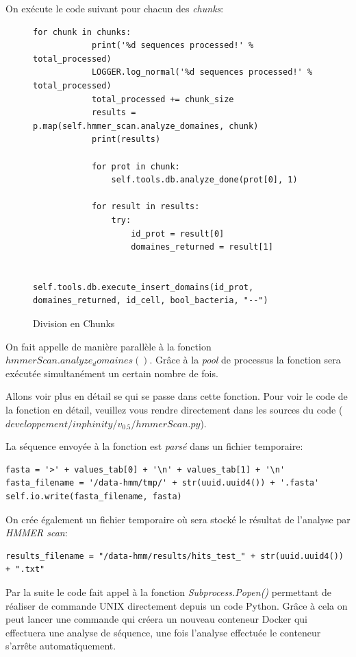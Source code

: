On exécute le code suivant pour chacun des \emph{chunks}:

\begin{figure}[H] 
\centering 
\begin{lstlisting}[frame=single]
for chunk in chunks:
            print('%d sequences processed!' % total_processed)
            LOGGER.log_normal('%d sequences processed!' % total_processed)
            total_processed += chunk_size
            results = p.map(self.hmmer_scan.analyze_domaines, chunk)
            print(results)

            for prot in chunk:
                self.tools.db.analyze_done(prot[0], 1)

            for result in results:
                try:
                    id_prot = result[0]
                    domaines_returned = result[1]

                    self.tools.db.execute_insert_domains(id_prot, domaines_returned, id_cell, bool_bacteria, "--")
\end{lstlisting} 
\caption[Division en Chunks]{Division en Chunks}
\label{fig:chunks} 
\end{figure}

On fait appelle de manière parallèle à la fonction \emph{$hmmerScan.analyze_domaines()$}. Grâce à la \emph{pool} de processus la fonction sera exécutée simultanément un certain nombre de fois.

Allons voir plus en détail se qui se passe dans cette fonction. Pour voir le code de la fonction en détail, veuillez vous rendre directement dans les sources du code (\emph{$developpement/inphinity/v_0.5/hmmerScan.py$}).

La séquence envoyée à la fonction est \emph{parsé} dans un fichier temporaire:

\begin{lstlisting}[frame=single]
fasta = '>' + values_tab[0] + '\n' + values_tab[1] + '\n'
fasta_filename = '/data-hmm/tmp/' + str(uuid.uuid4()) + '.fasta'
self.io.write(fasta_filename, fasta)
\end{lstlisting} 

On crée également un fichier temporaire où sera stocké le résultat de l'analyse par \emph{HMMER scan}:

\begin{lstlisting}[frame=single]
results_filename = "/data-hmm/results/hits_test_" + str(uuid.uuid4()) + ".txt"
\end{lstlisting} 

Par la suite le code fait appel à la fonction \emph{Subprocess.Popen()} permettant de réaliser de commande UNIX directement depuis un code Python. Grâce à cela on peut lancer une commande qui créera un nouveau conteneur Docker qui effectuera une analyse de séquence, une fois l'analyse effectuée le conteneur s'arrête automatiquement.


